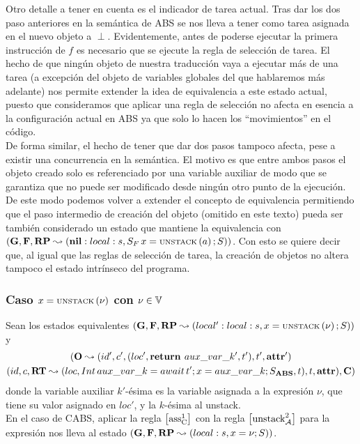 Otro detalle a tener en cuenta es el indicador de tarea actual. Tras dar los dos paso anteriores en la semántica de ABS se nos lleva a tener como tarea asignada en el nuevo objeto a $\perp$. Evidentemente, antes de poderse ejecutar la primera instrucción de $f$ es necesario que se ejecute la regla de selección de tarea. El hecho de que ningún objeto de nuestra traducción vaya a ejecutar más de una tarea (a excepción del objeto de variables globales del que hablaremos más adelante) nos permite extender la idea de equivalencia a este estado actual, puesto que consideramos que aplicar una regla de selección no afecta en esencia a la configuración actual en ABS ya que solo lo hacen los ``movimientos'' en el código.\\

De forma similar, el hecho de tener que dar dos pasos tampoco afecta, pese a existir una concurrencia en la semántica. El motivo es que entre ambos pasos el objeto creado solo es referenciado por una variable auxiliar de modo que se garantiza que no puede ser modificado desde ningún otro punto de la ejecución. De este modo podemos volver a extender el concepto de equivalencia permitiendo que el paso intermedio de creación del objeto (omitido en este texto) pueda ser también considerado un estado que mantiene la equivalencia con $(\mathbf{G}, \mathbf{F}, \textbf{RP} \leadsto (\textbf{nil}:local:s, S_F\,x = \text{\scriptsize{UNSTACK}}\left(a\right)\mbox{;\,}S))$. Con esto se quiere decir que, al igual que las reglas de selección de tarea, la creación de objetos no altera tampoco el estado intrínseco del programa.

\subsubsection{Caso $x = \text{\scriptsize{UNSTACK}}\left(\nu\right)$ con $\nu \in \mathbb{V}$}
Sean los estados equivalentes $(\mathbf{G}, \mathbf{F}, \textbf{RP} \leadsto (local':local:s,x = \text{\scriptsize{UNSTACK}}\left(\nu\right)\mbox{;\,}S))$ y
\begin{multline*}
  (\mathbf{O} \leadsto (id', c', (loc', \textbf{return } aux\_var\_k', t'), t', \textbf{attr}')\\
  (id, c, \textbf{RT} \leadsto (loc, Int\, aux\_var\_k = await\,t'\mbox{;\,} x = aux\_var\_k\mbox{;\,} S_{\textbf{ABS}}, t), t, \textbf{attr}), \mathbf{C})
\end{multline*}
donde la variable auxiliar $k'$-ésima es la variable asignada a la expresión $\nu$, que tiene su valor asignado en $loc'$, y la $k$-ésima al unstack.\\

En el caso de CABS, aplicar la regla $\left[ \text{ass}_{\text{C}}^{1} \right]$ con la regla $\left[ \text{unstack}_{\mathcal{A}}^{2} \right]$ para la expresión nos lleva al estado $(\mathbf{G}, \mathbf{F}, \textbf{RP} \leadsto (local:s, x = \nu \mbox{;\,} S))$.\\

